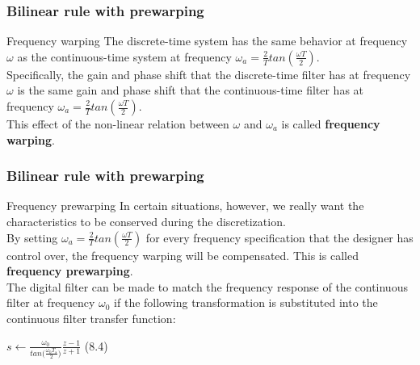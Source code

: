\begin{frame}
	\frametitle{Bilinear rule with prewarping}
	\begin{block}{Frequency warping}
		The discrete-time system has the same behavior at frequency $\omega$ as the continuous-time system at frequency $\omega_a = \frac{2}{T} tan(\frac{\omega T}{2})$. \\ 
		\vspace{1em}
		Specifically, the gain and phase shift that the discrete-time filter has at frequency $\omega$ is the same gain and phase shift that the continuous-time filter has at frequency  $\omega_a = \frac{2}{T} tan(\frac{\omega T}{2})$.\\
		\vspace{1em}
		This effect of the non-linear relation between $\omega$ and $\omega_a$ is called \textbf{frequency warping}.
	\end{block}
\end{frame}

\begin{frame}
	\frametitle{Bilinear rule with prewarping}
	\begin{block}{Frequency prewarping}
		In certain situations, however, we really want the characteristics to be conserved during the discretization.\\
		\vspace{1em}
		By setting $\omega_a = \frac{2}{T} tan(\frac{\omega T}{2})$ for every frequency specification that the designer has control over, the frequency warping will be compensated. This is called \textbf{frequency prewarping}.\\
		\vspace{1em}
		The digital filter can be made to match the frequency response of the continuous filter at frequency  $\omega_0$  if the following transformation is substituted into the continuous filter transfer function:
		\begin{center}
			$s \gets \frac{\omega_0}{tan\big(\frac{\omega_0T_s}{2}\big)} \frac{z-1}{z+1}$ (8.4)
		\end{center}
	\end{block}
\end{frame}

